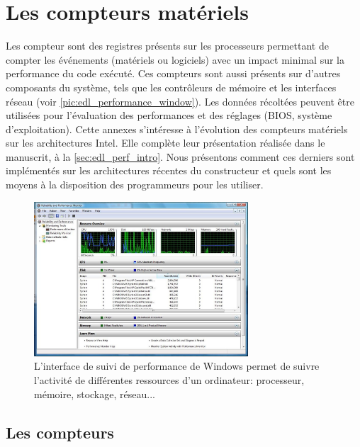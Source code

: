 \chapter{Les compteurs matériels}\label{annexe:hardware_counter}

    
    \minitoc
    \glsresetall

    Les \gls{compteur} sont des registres présents sur les processeurs permettant de compter les événements (matériels ou logiciels) avec un impact minimal sur la performance du code exécuté. Ces compteurs sont aussi présents sur d'autres composants du système, tels que les contrôleurs de mémoire et les interfaces réseau (voir \autoref{pic:edl_performance_window}). Les données récoltées peuvent être utilisées pour l'évaluation des performances et des réglages (BIOS, système d'exploitation). Cette annexes s'intéresse à l'évolution des compteurs matériels sur les architectures Intel. Elle complète leur présentation réalisée dans le manuscrit, à la \autoref{sec:edl_perf_intro}. Nous présentons comment ces derniers sont implémentés sur les architectures récentes du constructeur et quels sont les moyens à la disposition des programmeurs pour les utiliser.
    
        \begin{figure}[ht!]
            \center
            \includegraphics[width=8cm]{images/edl_performance_window.jpg}
            \caption{\label{pic:edl_performance_window} L'interface de suivi de performance de Windows permet de suivre l'activité de différentes ressources d'un ordinateur: processeur, mémoire, stockage, réseau...}
        \end{figure}
    

\section{Les compteurs}
    
